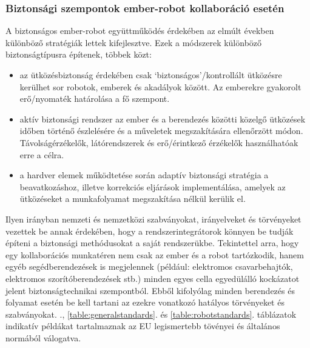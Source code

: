 \documentclass[../documentation.tex]{subfiles}
\begin{document}
\subsubsection{Biztonsági szempontok ember-robot kollaboráció esetén}
A biztonságos ember-robot együttműködés érdekében az elmúlt években különböző stratégiák lettek kifejlesztve. Ezek a módszerek különböző biztonságtípusra építenek, többek közt\cite{safehrc}:
\begin{itemize}
	\item az ütközésbiztonság érdekében csak `biztonságos'/kontrollált ütközésre kerülhet sor robotok, emberek és akadályok között. Az emberekre gyakorolt erő/nyomaték határolása a fő szempont.
	\item aktív biztonsági rendszer az ember és a berendezés közötti közelgő ütközések időben történő észlelésére és a műveletek megszakítására ellenőrzött módon. Távolságérzékelők, látórendszerek és erő/érintkező érzékelők használhatóak erre a célra.
	\item a hardver elemek működtetése során adaptív biztonsági stratégia a beavatkozáshoz, illetve korrekciós eljárások implementálása, amelyek az ütközéseket a munkafolyamat megszakítása nélkül kerülik el.
\end{itemize}
Ilyen irányban nemzeti és nemzetközi szabványokat, irányelveket és törvényeket vezettek be annak érdekében, hogy a rendszerintegrátorok könnyen be tudják építeni a biztonsági methódusokat a saját rendszerükbe. Tekintettel arra, hogy egy kollaborációs munkatéren nem csak az ember és a robot tartózkodik, hanem egyéb segédberendezések is megjelennek (például: elektromos csavarbehajtók, elektromos szorítóberendezések stb.) minden egyes cella egyedülálló kockázatot jelent biztonságtechnikai szempontból. Ebből kifolyólag minden berendezés és folyamat esetén be kell tartani az ezekre vonatkozó hatályos törvényeket és szabványokat. ., \ref{table:generalstandards}. és \ref{table:robotstandards}. táblázatok indikatív példákat tartalmaznak az EU legismertebb tövényei és általános normából válogatva.
\end{document}

